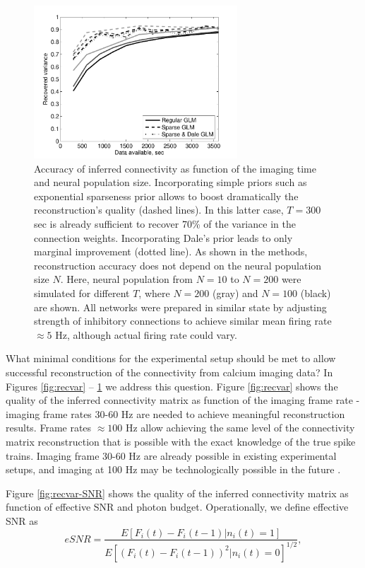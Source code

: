 \begin{figure}[h]
\centering
\includegraphics[width=3in]{../figs/FigureA7_recvar_NT}
\caption{Accuracy of inferred connectivity as function of the imaging time and neural population size. Incorporating simple priors such as exponential sparseness prior allows to boost dramatically the reconstruction's quality (dashed lines). In this latter case, $T=300$ sec is already sufficient to recover 70\% of the variance in the connection weights. Incorporating Dale's prior leads to only marginal improvement (dotted line). As shown in the methods, reconstruction accuracy does not depend on the neural population size $N$. Here, neural population from $N=10$ to $N=200$ were simulated for different $T$, where $N=200$ (gray) and $N=100$ (black) are shown. All networks were prepared in similar state by adjusting strength of inhibitory connections to achieve similar mean firing rate $\approx 5$ Hz, although actual firing rate could vary. }
\label{fig:recvar-NT}
\end{figure}


What minimal conditions for the experimental setup should be met to allow successful reconstruction of the connectivity from calcium imaging data? In Figures \ref{fig:recvar} -- \ref{fig:recvar-NT} we address this question. Figure \ref{fig:recvar} shows the quality of the inferred connectivity matrix as function of the imaging frame rate - imaging frame rates 30-60 Hz are needed to achieve meaningful reconstruction results. Frame rates $\approx 100$ Hz allow achieving the same level of the connectivity matrix reconstruction that is possible with the exact knowledge of the true spike trains. Imaging frame 30-60 Hz are already possible in existing experimental setups, and imaging at 100 Hz may be technologically possible in the future \cite{NguyenParker01,ReddySaggau05,Iyer06,SalomeBourdieu06,ReddySaggau08}.

Figure \ref{fig:recvar-SNR} shows the quality of the inferred connectivity matrix as function of effective SNR and photon budget. Operationally, we define effective SNR as
\begin{equation}
eSNR=\frac{E[F_i(t)-F_i(t-1)|n_i(t)=1]}{E[(F_i(t)-F_i(t-1))^2|n_i(t)=0]^{1/2}},
\end{equation}


